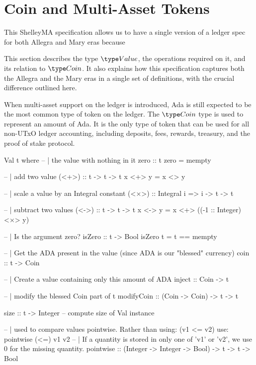 \section{Coin and Multi-Asset Tokens}
\label{sec:coin-ma}

This ShelleyMA specification allows us to have a single version of a ledger
spec for both Allegra and Mary eras because 

This section describes the type $\Value$, the operations required on
it, and its relation to $\Coin$. It also explains how this specification
captures both the Allegra and the Mary eras in a single set of definitions,
with the crucial difference outlined here.

When multi-asset support on the ledger is introduced, Ada is still expected to be
the most common type of token on the ledger.
The $\Coin$ type is used to represent an amount of Ada.
It is the only
type of token that can be used for all non-UTxO ledger accounting, including deposits,
fees, rewards, treasury, and the proof of stake protocol.

Val t
where
-- | the value with nothing in it
zero :: t
zero = mempty

-- | add two value
(<+>) :: t -> t -> t
x <+> y = x <> y

-- | scale a value by an Integral constant
(<×>) :: Integral i => i -> t -> t

-- | subtract two values
(<->) :: t -> t -> t
x <-> y = x <+> ((-1 :: Integer) <×> y)

-- | Is the argument zero?
isZero :: t -> Bool
isZero t = t == mempty

-- | Get the ADA present in the value (since ADA is our "blessed" currency)
coin :: t -> Coin

-- | Create a value containing only this amount of ADA
inject :: Coin -> t

-- | modify the blessed Coin part of t
modifyCoin :: (Coin -> Coin) -> t -> t

size :: t -> Integer -- compute size of Val instance

-- | used to compare values pointwise. Rather than using: (v1 <= v2) use: pointwise (<=) v1 v2
-- | If a quantity is stored in only one of 'v1' or 'v2', we use 0 for the missing quantity.
pointwise :: (Integer -> Integer -> Bool) -> t -> t -> Bool

